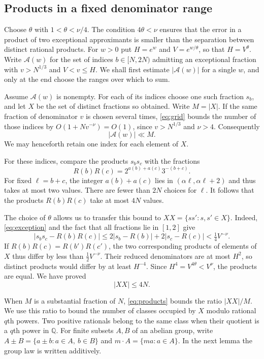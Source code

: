 \documentclass[11pt,reqno]{amsart}
\theoremstyle{definition}
\newcommand{\Q}{\mathbb Q}
\begin{document}
\subsection{Products in a fixed denominator range}

Choose $\theta$ with $1<\theta<\nu/4$. The condition
$4\theta<\nu$ ensures that the error in a product
of two exceptional approximants is smaller than
the separation between distinct rational products.
For $w>0$ put $H=e^w$ and $V=e^{w/\theta}$,
so that $H=V^\theta$. Write
$\mathcal A(w)$ for the set of indices $b\in[N,2N)$ admitting an
exceptional fraction with $v>N^{1/3}$ and $V<v\le H$. We shall
first estimate $|\mathcal A(w)|$ for a single $w$, and only at
the end choose the ranges over which to sum.

Assume $\mathcal A(w)$ is nonempty. For each of its indices choose
one such fraction $s_b$, and let $X$ be the set of distinct fractions
so obtained. Write $M=|X|$. If the same fraction of denominator $v$
is chosen several times, \eqref{eq:grid} bounds the number of those
indices by $O(1+Nv^{-\nu})=O(1)$, since $v>N^{1/3}$ and $\nu>4$.
Consequently
\begin{equation}\label{eq:multiplicity}
 |\mathcal A(w)|\ll M .
\end{equation}
We may henceforth retain one index for each element of $X$.

For these indices, compare the products $s_bs_c$ with the fractions
\[
 R(b)R(c)=2^{a(b)+a(c)}3^{-(b+c)} .
\]
For fixed $\ell=b+c$, the integer $a(b)+a(c)$ lies in
$(\alpha\ell,\alpha\ell+2)$ and thus takes at most two values.
There are fewer than $2N$ choices for $\ell$. It follows that the
products $R(b)R(c)$ take at most $4N$ values.

The choice of $\theta$ allows us to transfer this bound to
$XX=\{ss':s,s'\in X\}$. Indeed, \eqref{eq:exception} and the
fact that all fractions lie in $[1,2]$ give
\[
 |s_bs_c-R(b)R(c)|
 \le 2|s_b-R(b)|+2|s_c-R(c)|<\tfrac14 V^{-\nu}.
\]
If $R(b)R(c)=R(b')R(c')$, the two corresponding products of elements
of $X$ thus differ by less than $\tfrac12 V^{-\nu}$. Their reduced
denominators are at most $H^2$, so distinct products would differ by
at least $H^{-4}$. Since $H^4=V^{4\theta}<V^\nu$, the products
are equal. We have proved
\begin{equation}\label{eq:products}
 |XX|\le4N .
\end{equation}

When $M$ is a substantial fraction of $N$, \eqref{eq:products}
bounds the ratio $|XX|/M$. We use this ratio to bound the number of
classes occupied by $X$ modulo rational $q$th powers. Two positive
rationals belong to the same class when their quotient is a $q$th
power in $\Q$. For finite subsets $A,B$ of an abelian group, write
$A\pm B=\{a\pm b:a\in A,\ b\in B\}$ and
$m\cdot A=\{ma:a\in A\}$. In the next lemma
the group law is written additively.
\end{document}
